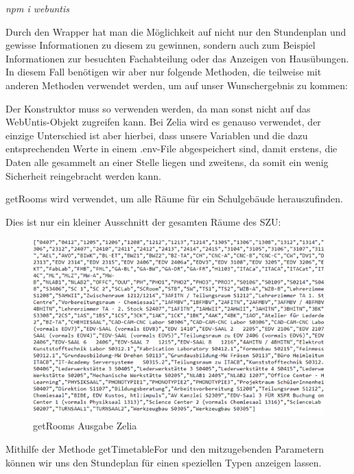 \emph{npm i webuntis}

Durch den Wrapper hat man die Möglichkeit auf nicht nur den Stundenplan und gewisse Informationen zu diesem zu gewinnen, sondern auch zum Beispiel Informationen zur besuchten Fachabteilung oder das Anzeigen von Hausübungen. In diesem Fall benötigen wir aber nur folgende Methoden, die teilweise mit anderen Methoden verwendet werden, um auf unser Wunschergebnis zu kommen:



Der Konstruktor muss so verwenden werden, da man sonst nicht auf das WebUntis-Objekt zugreifen kann. Bei Zelia wird es genauso verwendet, der einzige Unterschied ist aber hierbei, dass unsere Variablen und die dazu entsprechenden Werte in einem .env-File abgespeichert sind, damit erstens, die Daten alle gesammelt an einer Stelle liegen und zweitens, da somit ein wenig Sicherheit reingebracht werden kann.


getRooms wird verwendet, um alle Räume für ein Schulgebäude herauszufinden.


Dies ist nur ein kleiner Ausschnitt der gesamten Räume des SZU:

\begin{figure}[h]
    \centering
    \includegraphics{media/WebUntis/getRoomsAusgabe.png}
    \caption{getRooms Ausgabe Zelia}
\end{figure}

Mithilfe der Methode getTimetableFor und den mitzugebenden Parametern können wir uns den Stundeplan für einen speziellen Typen anzeigen lassen.

